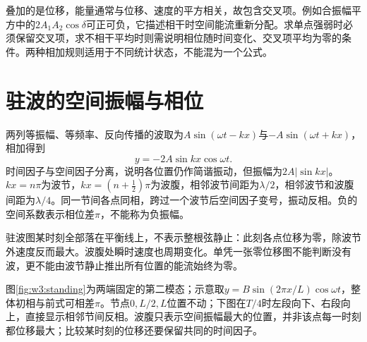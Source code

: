 叠加的是位移，能量通常与位移、速度的平方相关，故包含交叉项。例如合振幅平方中的$2A_1A_2\cos\delta$可正可负，它描述相干时空间能流重新分配。求单点强弱时必须保留交叉项，求不相干平均时则需说明相位随时间变化、交叉项平均为零的条件。两种相加规则适用于不同统计状态，不能混为一个公式。

\section{驻波的空间振幅与相位}
两列等振幅、等频率、反向传播的波取为$A\sin(\omega t-kx)$与$-A\sin(\omega t+kx)$，相加得到
\[
y=-2A\sin kx\cos\omega t.
\]
时间因子与空间因子分离，说明各位置仍作简谐振动，但振幅为$2A|\sin kx|$。$kx=n\pi$为波节，$kx=(n+\frac12)\pi$为波腹，相邻波节间距为$\lambda/2$，相邻波节和波腹间距为$\lambda/4$。同一节间各点同相，跨过一个波节后空间因子变号，振动反相。负的空间系数表示相位差$\pi$，不能称为负振幅。

驻波图某时刻全部落在平衡线上，不表示整根弦静止：此刻各点位移为零，除波节外速度反而最大。波腹处瞬时速度也周期变化。单凭一张零位移图不能判断没有波，更不能由波节静止推出所有位置的能流始终为零。


图\ref{fig:w3:standing}为两端固定的第二模态；示意取$y=B\sin(2\pi x/L)\cos\omega t$，整体初相与前式可相差$\pi$。节点$0,L/2,L$位置不动；下图在$T/4$时左段向下、右段向上，直接显示相邻节间反相。波腹只表示空间振幅最大的位置，并非该点每一时刻都位移最大；比较某时刻的位移还要保留共同的时间因子。


